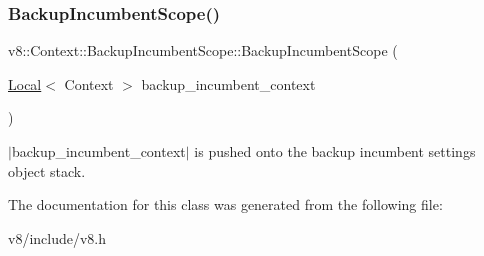 \subsubsection{\texorpdfstring{Backup\+Incumbent\+Scope()}{BackupIncumbentScope()}}
{\footnotesize\ttfamily v8\+::\+Context\+::\+Backup\+Incumbent\+Scope\+::\+Backup\+Incumbent\+Scope (\begin{DoxyParamCaption}\item[{\mbox{\hyperlink{classv8_1_1Local}{Local}}$<$ Context $>$}]{backup\+\_\+incumbent\+\_\+context }\end{DoxyParamCaption})\hspace{0.3cm}{\ttfamily [explicit]}}

$\vert$backup\+\_\+incumbent\+\_\+context$\vert$ is pushed onto the backup incumbent settings object stack. 

The documentation for this class was generated from the following file\+:\begin{DoxyCompactItemize}
\item 
v8/include/v8.\+h\end{DoxyCompactItemize}
